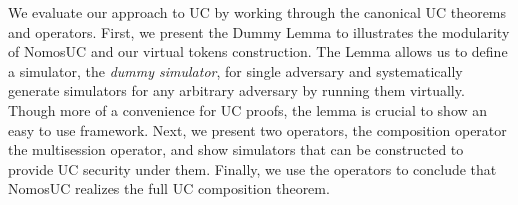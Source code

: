 We evaluate our approach to UC by working through the canonical UC theorems and operators.
First, we present the Dummy Lemma to illustrates the modularity of NomosUC and our virtual tokens construction.
The Lemma allows us to define a simulator, the \emph{dummy simulator}, for single adversary and systematically generate simulators for any arbitrary adversary
by running them virtually. Though more of a convenience for UC proofs, the lemma is crucial to show an easy to use framework.
Next, we present two operators, the composition operator the multisession operator, and show simulators that can be constructed to provide UC security under them.
Finally, we use the operators to conclude that NomosUC realizes the full UC composition theorem.

